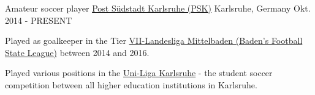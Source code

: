 

\begin{cventries}

  \cventry
    {Amateur soccer player} %
    {\href{https://www.fupa.net/player/nv-martin-loper-702462}{Post Südstadt Karlsruhe (PSK)}} %
    {Karlsruhe, Germany} %
    {Okt. 2014 - PRESENT} %
    {
      \begin{cvitems} %
        \item {Played as goalkeeper in the Tier \href{https://de.wikipedia.org/wiki/Fu\%C3\%9Fball-Landesliga_Baden}{VII-Landesliga Mittelbaden (Baden's Football State League)} between 2014 and 2016.}
        \item {Played various positions in the \href{https://karlsruhe-uni-liga.de/}{Uni-Liga Karlsruhe} - the student soccer competition between all higher education institutions in Karlsruhe.}
      \end{cvitems}
    }

\end{cventries}
